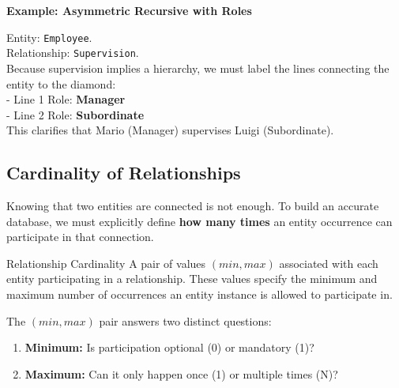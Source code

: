 \vspace{0.2cm}
\begin{example}{\textbf{Example: Asymmetric Recursive with Roles}}


    
\vspace{0.2cm}
Entity: \texttt{Employee}.\\
Relationship: \texttt{Supervision}.\\
Because supervision implies a hierarchy, we must label the lines connecting the entity to the diamond:\\
- Line 1 Role: \textbf{Manager}\\
- Line 2 Role: \textbf{Subordinate}\\
This clarifies that Mario (Manager) supervises Luigi (Subordinate).

\vs

\begin{center}
\end{center}
\end{example}

\subsection{Cardinality of Relationships}
Knowing that two entities are connected is not enough. To build an accurate database, we must explicitly define \textbf{how many times} an entity occurrence can participate in that connection.

\begin{defbox}{Relationship Cardinality}
A pair of values $(min, max)$ associated with each entity participating in a relationship. These values specify the minimum and maximum number of occurrences an entity instance is allowed to participate in.
\end{defbox}

The $(min, max)$ pair answers two distinct questions:
\begin{enumerate}
    \item \textbf{Minimum:} Is participation optional (0) or mandatory (1)?
    \item \textbf{Maximum:} Can it only happen once (1) or multiple times (N)?
\end{enumerate}

